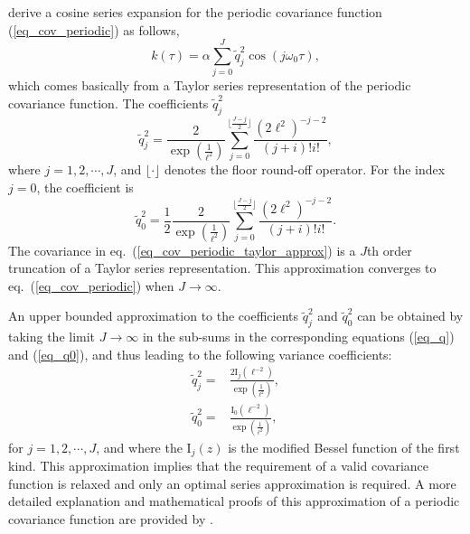 \citet{solin2014explicit} derive a cosine series expansion for the periodic covariance function (\ref{eq_cov_periodic}) as follows,
% 
\begin{equation} \label{eq_cov_periodic_taylor_approx}
k(\tau)= \alpha \sum_{j=0}^{J} \tilde{q}_j^2 \cos(j\omega_0 \tau),
\end{equation}
which comes basically from a Taylor series representation of the periodic covariance function. The coefficients $\tilde{q}_j^2$ 
%
\begin{equation} \label{eq_q}
\tilde{q}_j^2= \frac{2}{\exp(\frac{1}{\ell^2})} \sum_{j=0}^{\lfloor \frac{J-j}{2} \rfloor} \frac{(2\ell^2)^{-j-2}}{(j+i)!i!},
\end{equation}
where $j=1,2,\cdots,J$, and $\lfloor \cdot \rfloor$ denotes the floor round-off operator. For the index $j=0$, the coefficient is 
%
\begin{equation} \label{eq_q0}
\tilde{q}_0^2= \frac{1}{2} \frac{2}{\exp(\frac{1}{\ell^2})} \sum_{j=0}^{\lfloor \frac{J-j}{2} \rfloor} \frac{(2\ell^2)^{-j-2}}{(j+i)!i!}.
\end{equation}
The covariance in eq.~(\ref{eq_cov_periodic_taylor_approx}) is a $J$th order truncation of a Taylor series representation. This approximation converges to eq.~(\ref{eq_cov_periodic}) when $J \rightarrow \infty$.

An upper bounded approximation to the coefficients $\tilde{q}_j^2$ and $\tilde{q}_0^2$ can be obtained by taking the limit $J \rightarrow \infty$ in the sub-sums in the corresponding equations (\ref{eq_q}) and (\ref{eq_q0}), and thus leading to the following variance coefficients:
%
\begin{equation}\label{eq_q_2}
\begin{split}
\tilde{q}_j^2=& \frac{2\mathrm{I}_j(\ell^{-2})}{\exp(\frac{1}{\ell^2})}, \\
\tilde{q}_0^2=& \frac{\mathrm{I}_0(\ell^{-2})}{\exp(\frac{1}{\ell^2})},
\end{split}
\end{equation} 
for $j=1,2,\cdots,J$, and where the $\mathrm{I}_{j}(z)$ is the modified Bessel function \citep{handbook1970m} of the first kind. This approximation implies that the requirement of a valid covariance function is relaxed and only an optimal series approximation is required. A more detailed explanation and mathematical proofs of this approximation of a periodic covariance function are provided by \citet{solin2014explicit}. 

